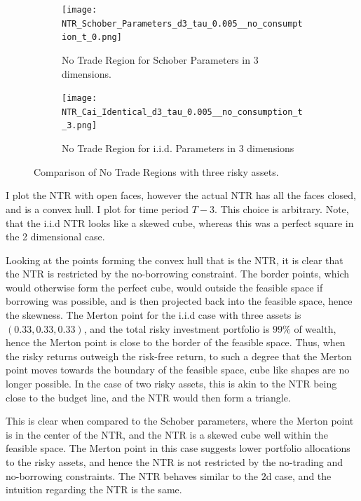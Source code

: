 \documentclass[11pt]{article}
\begin{document}
\begin{figure}[!ht]
    \centering
    \begin{subfigure}[t]{0.48\textwidth}
        \centering
        \texttt{[image: NTR\_Schober\_Parameters\_d3\_tau\_0.005\_\_no\_consumption\_t\_0.png]}
        \caption{No Trade Region for Schober Parameters in 3 dimensions.}
        \label{fig:NTR_3d_Schober}
    \end{subfigure}%
    \hfill
    \begin{subfigure}[t]{0.48\textwidth}
        \centering
        \texttt{[image: NTR\_Cai\_Identical\_d3\_tau\_0.005\_\_no\_consumption\_t\_3.png]}
        \caption{No Trade Region for i.i.d. Parameters in 3 dimensions}
        \label{fig:NTR_3d_iid_Correlation}
    \end{subfigure}

    \caption{Comparison of No Trade Regions with three risky assets.}
    \label{fig:comparison_NTR_3d}
\end{figure}
I plot the NTR with open faces, however the actual NTR has all the faces closed, and is a convex hull. I plot for time period $T-3$. This choice is arbitrary.
Note, that the i.i.d NTR looks like a skewed cube, whereas this was a perfect square in the 2 dimensional case.

Looking at the points forming the convex hull that is the NTR, it is clear that the NTR is restricted by the no-borrowing constraint.
The border points, which would otherwise form the perfect cube, would outside the feasible space if borrowing was possible, and is then projected back into the feasible space, hence the skewness.
The Merton point for the i.i.d case with three assets is $(0.33, 0.33, 0.33)$, and the total risky investment portfolio is $99\%$ of wealth, hence the Merton point is close to the border of the feasible space.
Thus, when the risky returns outweigh the risk-free return,
to such a degree that the Merton point moves towards the boundary of the feasible space, cube like shapes are no longer possible.
In the case of two risky assets, this is akin to the \ac{NTR} being close to the budget line, and the \ac{NTR} would then form a triangle.

This is clear when compared to the Schober parameters, where the Merton point is in the center of the NTR, and the NTR is a skewed cube well within the feasible space.
The Merton point in this case suggests lower portfolio allocations to the risky assets, and hence the NTR is not restricted by the no-trading and no-borrowing constraints.
The NTR behaves similar to the $2$d case, and the intuition regarding the NTR is the same.
\end{document}
